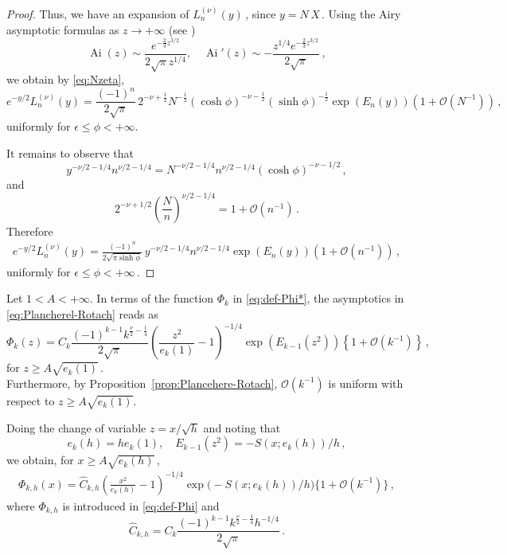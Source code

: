 \documentclass[11pt]{amsart}
\numberwithin{equation}{section}
\theoremstyle{remark}
\begin{document}
\begin{proof}
Thus, we have an expansion of $L_n^{(\nu)}(y)\,$, since $y=N\,X\,$. 
%
%
Using the Airy asymptotic formulas as $z\to+\infty$ (see \cite[Eq. (9.7.5) and (9.7.6)]{DLMF})
\[\operatorname{Ai}\left(z\right)\sim\frac{e^{-\frac23z^{3/2}}}{2\sqrt{\pi}z^{1/4}},\quad \operatorname{Ai}'\left(z\right)\sim-\frac{z^{1/4}e^{-\frac23z^{3/2}}}{2\sqrt{\pi}}\,,\]
%
we obtain by \eqref{eq:Nzeta},
\[
e^{-y/2}L_n^{(\nu)}(y)
=
\frac{(-1)^n}{2\sqrt{\pi}}\,
2^{-\nu+\frac12}N^{-\frac12}
(\cosh\phi)^{-\nu-\frac12}
(\sinh\phi)^{-\frac12}
\exp\left(E_n(y)\right)
\left(1+\mathcal O(N^{-1})\right)\,,
\]
uniformly for \(\epsilon\leq\phi<+\infty.\)

It remains to observe that
\[
y^{-\nu/2-1/4}n^{\nu/2-1/4}
=
N^{-\nu/2-1/4}n^{\nu/2-1/4}
(\cosh\phi)^{-\nu-1/2}\,,
\]
and
\[
2^{-\nu+1/2}
\left(\frac{N}{n}\right)^{\nu/2-1/4}
=
1+\mathcal O(n^{-1})\,.
\]
Therefore
\[
\begin{aligned}
e^{-y/2}L_n^{(\nu)}(y)
=
\frac{(-1)^n}{2\sqrt{\pi\sinh\phi}}\,
y^{-\nu/2-1/4}
n^{\nu/2-1/4}
\exp\left(E_n(y)\right)
\left(1+\mathcal O(n^{-1})\right)\,,
\end{aligned}
\]
uniformly for
\(\epsilon\leq\phi<+\infty\,.
\)
\end{proof}
%
%

Let $1<A<+\infty$. In terms of the function $\Phi_k$ in \eqref{eq:def-Phi*},  the asymptotics in \eqref{eq:Plancherel-Rotach} reads as
\[\Phi_k(z) = C_k \frac{(-1)^{k-1} k^{\frac{\nu}{2}-\frac{1}{4}}}{2\sqrt{\pi}} \left(\frac{z^2}{e_k(1)}-1\right)^{-1/4} \exp(E_{k-1}(z^2)) \left\{1 + \mathcal{O}(k^{-1})\right\}\,,
\] 
 for $z\geq A\sqrt{e_k(1)}\,$.\\
Furthermore, by Proposition~\ref{prop:Plancehere-Rotach}, $\mathcal O(k^{-1})$ is uniform with respect to $z\geq A\sqrt{e_k(1)}.$
%

Doing the change of variable $z=x/\sqrt{h}$ and noting that
\[e_k(h)=he_k(1),\quad  E_{k-1}(z^2)=-S(x;e_k(h))/h\,,\]
we obtain, for $x\geq A\sqrt{e_k(h)}\,,$
\[\begin{split}
		\Phi_{k,h}(x)
		=
		\hat C_{k,h}
		\left(\frac{x^2}{e_k(h)}-1\right)^{-1/4}
		\exp\bigl(-S(x;e_k(h))/h\bigr)
		\bigl\{1+\mathcal O(k^{-1})\bigr\}\,,
	\end{split}
	\]
where $\Phi_{k,h}$ is introduced in \eqref{eq:def-Phi} and
\[\hat C_{k,h}=C_k\frac{(-1)^{k-1}k^{\frac{\nu}{2}-\frac{1}{4}}h^{-1/4}}{2\sqrt{\pi}}\,.\]

 
\end{document}
